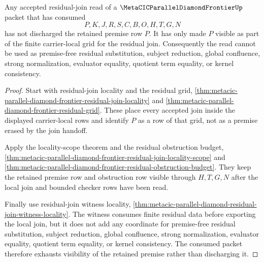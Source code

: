 \begin{theorem}
\label{thm:metacic-parallel-diamond-frontier-residual-premise-exhaustion}
Any accepted residual-join read of a $\MetaCICParallelDiamondFrontierUp$ packet
that has consumed
$$
P,K,J,R,S,C,B,O,H,T,G,N
$$
has not discharged the retained premise row $P$. It has only made $P$ visible
as part of the finite carrier-local grid for the residual join. Consequently
the read cannot be used as premise-free residual substitution, subject
reduction, global confluence, strong normalization, evaluator equality,
quotient term equality, or kernel consistency.
\end{theorem}
\begin{proof}
Start with residual-join locality and the residual grid,
\autoref{thm:metacic-parallel-diamond-frontier-residual-join-locality} and
\autoref{thm:metacic-parallel-diamond-frontier-residual-grid}. These place every
accepted join inside the displayed carrier-local rows and identify $P$ as a row
of that grid, not as a premise erased by the join handoff.

Apply the locality-scope theorem and the residual obstruction budget,
\autoref{thm:metacic-parallel-diamond-frontier-residual-join-locality-scope} and
\autoref{thm:metacic-parallel-diamond-frontier-residual-obstruction-budget}.
They keep the retained premise row and obstruction row visible through
$H,T,G,N$ after the local join and bounded checker rows have been read.

Finally use residual-join witness locality,
\autoref{thm:metacic-parallel-diamond-residual-join-witness-locality}. The
witness consumes finite residual data before exporting the local join, but it
does not add any coordinate for premise-free residual substitution, subject
reduction, global confluence, strong normalization, evaluator equality,
quotient term equality, or kernel consistency. The consumed packet therefore
exhausts visibility of the retained premise rather than discharging it.
\end{proof}

